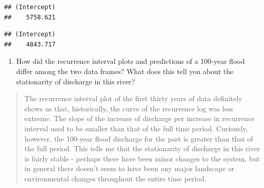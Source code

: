 \documentclass[]{article}
\newenvironment{Shaded}{\begin{snugshade}}{\end{snugshade}}
\newcommand{\CommentTok}[1]{\textcolor[rgb]{0.56,0.35,0.01}{\textit{#1}}}
\newcommand{\DecValTok}[1]{\textcolor[rgb]{0.00,0.00,0.81}{#1}}
\newcommand{\FloatTok}[1]{\textcolor[rgb]{0.00,0.00,0.81}{#1}}
\newcommand{\KeywordTok}[1]{\textcolor[rgb]{0.13,0.29,0.53}{\textbf{#1}}}
\newcommand{\NormalTok}[1]{#1}
\newcommand{\OperatorTok}[1]{\textcolor[rgb]{0.81,0.36,0.00}{\textbf{#1}}}
\newcommand{\StringTok}[1]{\textcolor[rgb]{0.31,0.60,0.02}{#1}}
\providecommand{\tightlist}{%
  \setlength{\itemsep}{0pt}\setlength{\parskip}{0pt}}
\begin{document}
\begin{Shaded}
\end{Shaded}

\begin{verbatim}
## (Intercept) 
##    5758.621
\end{verbatim}

\begin{Shaded}
\end{Shaded}

\begin{verbatim}
## (Intercept) 
##    4843.717
\end{verbatim}

\begin{enumerate}
\def\labelenumi{\arabic{enumi}.}
\setcounter{enumi}{11}
\tightlist
\item
  How did the recurrence interval plots and predictions of a 100-year
  flood differ among the two data frames? What does this tell you about
  the stationarity of discharge in this river?
\end{enumerate}

\begin{quote}
The recurrence interval plot of the first thirty years of data
definitely shows us that, historically, the curve of the recurrence log
was less extreme. The slope of the increase of discharge per increase in
recurrence interval used to be smaller than that of the full time
period. Curiously, however, the 100-year flood discharge for the past is
greater than that of the full period. This tells me that the
stationarity of discharge in this river is fairly stable - perhaps there
have been minor changes to the system, but in general there doesn't seem
to have been any major landscape or environmental changes throughout the
entire time period.
\end{quote}
\end{document}
